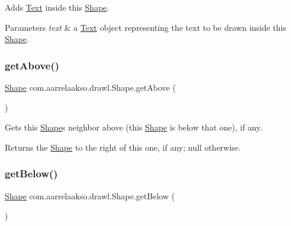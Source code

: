 Adds \hyperlink{classcom_1_1aarrelaakso_1_1drawl_1_1_text}{Text} inside this \hyperlink{classcom_1_1aarrelaakso_1_1drawl_1_1_shape}{Shape}. 


\begin{DoxyParams}{Parameters}
{\em text} & a \hyperlink{classcom_1_1aarrelaakso_1_1drawl_1_1_text}{Text} object representing the text to be drawn inside this \hyperlink{classcom_1_1aarrelaakso_1_1drawl_1_1_shape}{Shape}. \\
\hline
\end{DoxyParams}
\mbox{\label{classcom_1_1aarrelaakso_1_1drawl_1_1_shape_acebea2aa57031322323c9bf50ee447db}} 
\subsubsection{\texorpdfstring{get\+Above()}{getAbove()}}
{\footnotesize\ttfamily \hyperlink{classcom_1_1aarrelaakso_1_1drawl_1_1_shape}{Shape} com.\+aarrelaakso.\+drawl.\+Shape.\+get\+Above (\begin{DoxyParamCaption}{ }\end{DoxyParamCaption})\hspace{0.3cm}{\ttfamily [inherited]}}



Gets this \hyperlink{classcom_1_1aarrelaakso_1_1drawl_1_1_shape}{Shape}\textquotesingle{}s neighbor above (this \hyperlink{classcom_1_1aarrelaakso_1_1drawl_1_1_shape}{Shape} is below that one), if any. 

\begin{DoxyReturn}{Returns}
the \hyperlink{classcom_1_1aarrelaakso_1_1drawl_1_1_shape}{Shape} to the right of this one, if any; {\ttfamily null} otherwise. 
\end{DoxyReturn}
\mbox{\label{classcom_1_1aarrelaakso_1_1drawl_1_1_shape_a53de5ab609d879719cd3b372dfe8df58}} 
\subsubsection{\texorpdfstring{get\+Below()}{getBelow()}}
{\footnotesize\ttfamily \hyperlink{classcom_1_1aarrelaakso_1_1drawl_1_1_shape}{Shape} com.\+aarrelaakso.\+drawl.\+Shape.\+get\+Below (\begin{DoxyParamCaption}{ }\end{DoxyParamCaption})\hspace{0.3cm}{\ttfamily [inherited]}}



